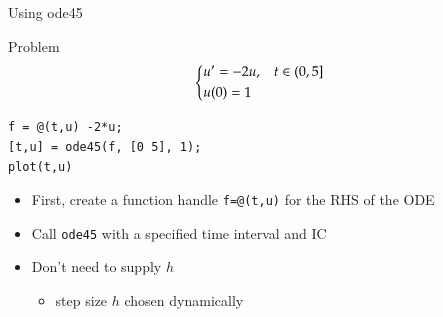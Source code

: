 \documentclass[10pt]{beamer}
\begin{document}
\begin{frame}[fragile]{Using ode45}
\begin{block}{Problem}
$$
\begin{dcases}
    u' = -2u, &t\in(0,5]\\
    u(0)=1
\end{dcases}
$$
\end{block}

\begin{lstlisting}
f = @(t,u) -2*u;
[t,u] = ode45(f, [0 5], 1);
plot(t,u)
\end{lstlisting}

\vspace{3mm}

\begin{itemize}
\item First, create a function handle \texttt{f=@(t,u)} for the RHS of the ODE
\item Call \texttt{ode45} with a specified time interval and IC
\item Don't need to supply $h$
\begin{itemize}
    \item step size $h$ chosen dynamically
\end{itemize}
\end{itemize}

\end{frame}

\end{document}
